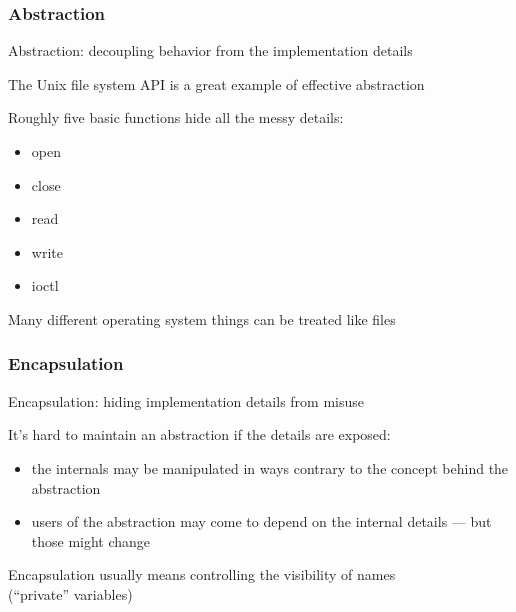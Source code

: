 \documentclass[handout,compress,t,11pt]{beamer}
\begin{document}
\begin{frame}[fragile]
    \frametitle{Abstraction}
    Abstraction: decoupling behavior from the implementation details \par
    \vspace{\baselineskip}
    The Unix file system API is a great example of effective abstraction \par
    \vspace{0.4\baselineskip}
    Roughly five basic functions hide all the messy details:
    \begin{itemize}
        \item open
        \item close
        \item read
        \item write
        \item ioctl
    \end{itemize}
    \vspace{\baselineskip}
    Many different operating system things can be treated like files
\end{frame}

\begin{frame}[fragile]
    \frametitle{Encapsulation}
    Encapsulation: hiding implementation details from misuse \par
    \vspace{\baselineskip}
    It's hard to maintain an abstraction if the details are exposed: \par
    \begin{itemize}
        \item the internals may be manipulated in ways contrary to 
              the concept behind the abstraction
        \item users of the abstraction may come to depend on the
              internal details --- but those might change
    \end{itemize}
    \vspace{0.6\baselineskip}
    Encapsulation usually means controlling the visibility of names \\
    (``private'' variables) \par
\end{frame}
\end{document}

